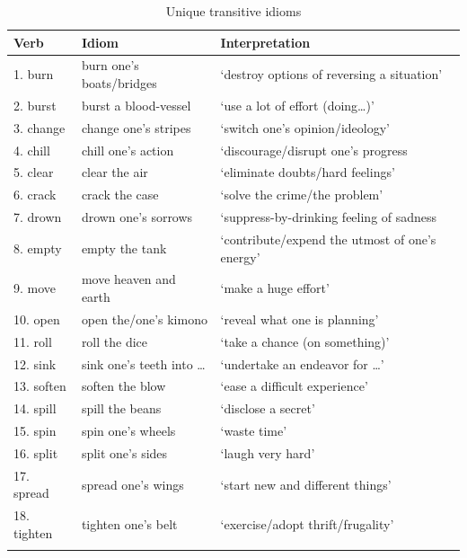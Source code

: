 \documentclass[output=paper]{langsci/langscibook}
\begin{document}
\begin{paperappendix}
\begin{table}[H]
{\smaller
\caption{Unique transitive idioms}
\begin{tabularx}{\textwidth}{lll}
\lsptoprule
{Verb} & {Idiom} & {Interpretation} \\
\midrule
{1. burn}  & burn one’s boats/bridges & ‘destroy options of reversing a situation’ \\
{2. burst}  & burst a blood-vessel & ‘use a lot of effort (doing…)’\\
{3. change} & change one’s stripes~ & ‘switch one’s opinion/ideology’ \\
{4. chill}  & chill one’s action & ‘discourage/disrupt one’s progress \\
{5. clear}  & clear the air & ‘eliminate doubts/hard feelings’\\
{6. crack}  & crack the case & ‘solve the crime/the problem’ \\
{7. drown}  & drown one’s sorrows & ‘suppress-by-drinking feeling of sadness\\
{8. empty}  & empty the tank & ‘contribute/expend the utmost of one’s energy’ \\
{9. move}  & move heaven and earth & ‘make a huge effort’ \\
{10. open}  & open the/one’s kimono & ‘reveal what one is planning’\\
{11. roll}  & roll the dice & ‘take a chance (on something)’ \\
{12. sink}  & sink one’s teeth into \dots & ‘undertake an endeavor for \dots’\\
{13. soften}  & soften the blow & ‘ease a difficult experience’ \\
{14. spill}  & spill the beans & ‘disclose a secret’ \\
{15. spin}  & spin one’s wheels & ‘waste time’\\
{16. split}  & split one’s sides & ‘laugh very hard’\\
{17. spread}  & spread one’s wings & ‘start new and different things’  \\
{18. tighten} & tighten one’s belt & ‘exercise/adopt thrift/frugality’\\
\lspbottomrule
\end{tabularx}
}
\end{table}


\end{paperappendix}
\end{document}
